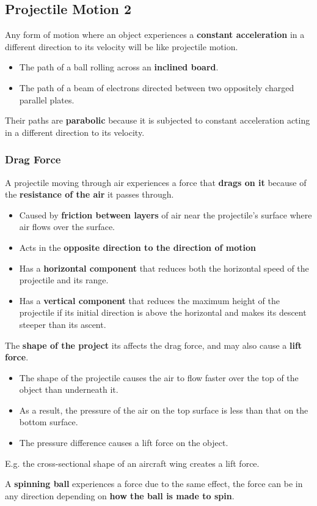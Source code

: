 \subsection{Projectile Motion 2}

Any form of motion where an object experiences a \textbf{constant acceleration} in a different direction to its velocity will be like projectile motion.
\begin{itemize}
    \item The path of a ball rolling across an \textbf{inclined board}.
    \item The path of a beam of electrons directed between two oppositely charged parallel plates.
\end{itemize}
Their paths are \textbf{parabolic} because it is subjected to constant acceleration acting in a different direction to its velocity.

\subsubsection*{Drag Force}

A projectile moving through air experiences a force that \textbf{drags on it} because of the \textbf{resistance of the air} it passes through.
\begin{itemize}
    \item Caused by \textbf{friction between layers} of air near the projectile's surface where air flows over the surface.
    \item Acts in the \textbf{opposite direction to the direction of motion}
    \item Has a \textbf{horizontal component} that reduces both the horizontal speed of the projectile and its range.
    \item Has a \textbf{vertical component} that reduces the maximum height of the projectile if its initial direction is above the horizontal and makes its descent steeper than its ascent.
\end{itemize}

The \textbf{shape of the project} its affects the drag force, and may also cause a \textbf{lift force}.
\begin{itemize}
    \item The shape of the projectile causes the air to flow faster over the top of the object than underneath it.
    \item As a result, the pressure of the air on the top surface is less than that on the bottom surface.
    \item The pressure difference causes a lift force on the object.
\end{itemize}
E.g. the cross-sectional shape of an aircraft wing creates a lift force.

A \textbf{spinning ball} experiences a force due to the same effect, the force can be in any direction depending on \textbf{how the ball is made to spin}.

